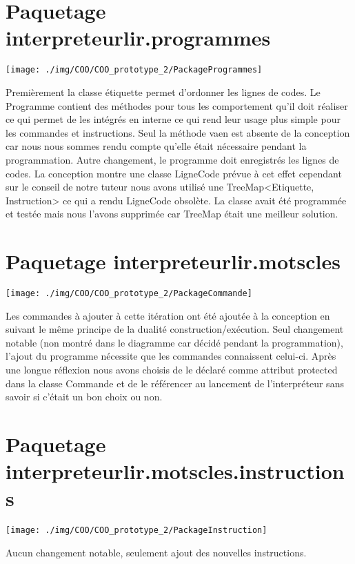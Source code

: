 \section{Paquetage interpreteurlir.programmes}
\begin{center}\texttt{[image: ./img/COO/COO\_prototype\_2/PackageProgrammes]}\end{center}
\par Premièrement la classe étiquette permet d'ordonner les lignes de codes. Le Programme contient des méthodes pour tous les comportement qu'il doit réaliser ce qui permet de les intégrés en interne ce qui rend leur usage plus simple pour les commandes et instructions. Seul la méthode vaen est absente de la conception car nous nous sommes rendu compte qu'elle était nécessaire pendant la programmation. Autre changement, le programme doit enregistrés les lignes de codes. La conception montre une classe LigneCode prévue à cet effet cependant sur le conseil de notre tuteur nous avons utilisé une TreeMap<Etiquette, Instruction> ce qui a rendu LigneCode obsolète. La classe avait été programmée et testée mais nous l'avons supprimée car TreeMap était une meilleur solution.

\section{Paquetage interpreteurlir.motscles} 
\begin{center}\texttt{[image: ./img/COO/COO\_prototype\_2/PackageCommande]}\end{center}
\par Les commandes à ajouter à cette itération ont été ajoutée à la conception en suivant le même principe de la dualité construction/exécution. Seul changement notable (non montré dans le diagramme car décidé pendant la programmation), l'ajout du programme nécessite que les commandes connaissent celui-ci. Après une longue réflexion nous avons choisis de le déclaré comme attribut protected dans la classe Commande et de le référencer au lancement de l'interpréteur sans savoir si c'était un bon choix ou non.

\section{Paquetage interpreteurlir.motscles.instructions} 
\begin{center}\texttt{[image: ./img/COO/COO\_prototype\_2/PackageInstruction]}\end{center}
\par Aucun changement notable, seulement ajout des nouvelles instructions.

